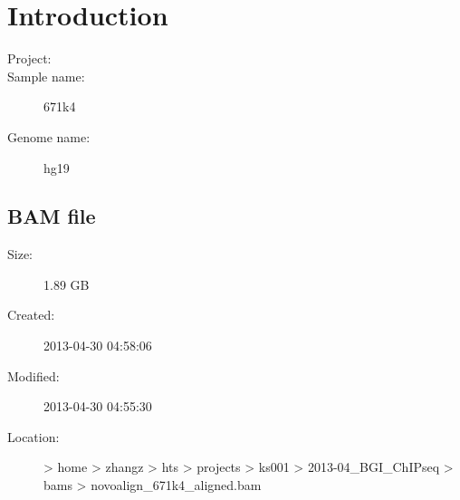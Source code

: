 \documentclass{article}
\begin{document}
\newpage
\section{Introduction}
\begin{description}
\item[\large{Project:}] 
\item[\large{Sample name:}] 671k4
\item[\large{Genome name:}] hg19
\end{description}

\subsection{BAM file}
\begin{description}
\item[\large{Size:}] 1.89 GB
\item[\large{Created:}] 2013-04-30 04:58:06
\item[\large{Modified:}] 2013-04-30 04:55:30
\item[\large{Location:}]  > home > zhangz > hts > projects > ks001 > 2013-04_BGI_ChIPseq > bams > novoalign_671k4_aligned.bam
\end{description}
\end{document}
